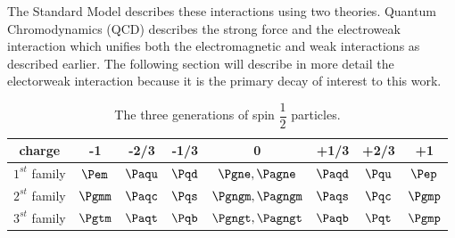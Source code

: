 The Standard Model describes these interactions using two theories.  Quantum Chromodynamics (QCD) describes the strong force and the electroweak interaction \cite{Glashow1961} which unifies both the electromagnetic and weak interactions as described earlier. The following section will describe in more detail the electorweak interaction because it is the primary decay of interest to this work.










\begin{table}[htb]
\caption{%
  \small The three generations of spin $\dfrac{1}{2}$ particles. %
}
\begin{center}
\begin{tabular}{ c c c c c c c c }
charge       & -1     & -2/3 & -1/3 & 0 & +1/3 & +2/3 & +1\\ \hline
$1^{st}$ family & $\Pem$ & $\Paqu$ & $\Pqd$ & $\Pgne , \Pagne$ & $\Paqd$ & $\Pqu$ & $\Pep$\\
$2^{st}$ family & $\Pgmm$ & $\Paqc$ & $\Pqs$ & $\Pgngm , \Pagngm$ & $\Paqs$ & $\Pqc$ & $\Pgmp$\\
$3^{st}$ family & $\Pgtm$ & $\Paqt$ & $\Pqb$ & $\Pgngt , \Pagngt$ & $\Paqb$ & $\Pqt$ & $\Pgmp$\\
\end{tabular}
\end{center}
\label{tab:threegenerations}
\end{table}

